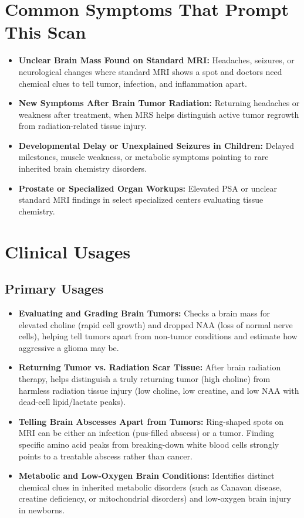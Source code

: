 \section{Common Symptoms That Prompt This Scan}
\begin{itemize}
\item \textbf{Unclear Brain Mass Found on Standard MRI:} Headaches, seizures, or neurological changes where standard MRI shows a spot and doctors need chemical clues to tell tumor, infection, and inflammation apart.
\item \textbf{New Symptoms After Brain Tumor Radiation:} Returning headaches or weakness after treatment, when MRS helps distinguish active tumor regrowth from radiation-related tissue injury.
\item \textbf{Developmental Delay or Unexplained Seizures in Children:} Delayed milestones, muscle weakness, or metabolic symptoms pointing to rare inherited brain chemistry disorders.
\item \textbf{Prostate or Specialized Organ Workups:} Elevated PSA or unclear standard MRI findings in select specialized centers evaluating tissue chemistry.
\end{itemize}

\section{Clinical Usages}

\subsection{Primary Usages}
\begin{itemize}
\item \textbf{Evaluating and Grading Brain Tumors:} Checks a brain mass for elevated choline (rapid cell growth) and dropped NAA (loss of normal nerve cells), helping tell tumors apart from non-tumor conditions and estimate how aggressive a glioma may be.
\item \textbf{Returning Tumor vs. Radiation Scar Tissue:} After brain radiation therapy, helps distinguish a truly returning tumor (high choline) from harmless radiation tissue injury (low choline, low creatine, and low NAA with dead-cell lipid/lactate peaks).
\item \textbf{Telling Brain Abscesses Apart from Tumors:} Ring-shaped spots on MRI can be either an infection (pus-filled abscess) or a tumor. Finding specific amino acid peaks from breaking-down white blood cells strongly points to a treatable abscess rather than cancer.
\item \textbf{Metabolic and Low-Oxygen Brain Conditions:} Identifies distinct chemical clues in inherited metabolic disorders (such as Canavan disease, creatine deficiency, or mitochondrial disorders) and low-oxygen brain injury in newborns.
\end{itemize}

